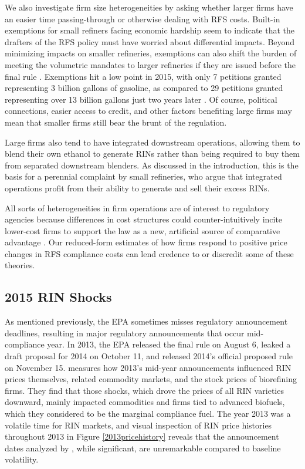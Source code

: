 \documentclass[11pt]{article}
\begin{document}
We also investigate firm size heterogeneities by asking whether larger firms have an easier time passing-through or otherwise dealing with RFS costs. Built-in exemptions for small refiners facing economic hardship seem to indicate that the drafters of the RFS policy must have worried about differential impacts. Beyond minimizing impacts on smaller refineries, exemptions can also shift the burden of meeting the volumetric mandates to larger refineries if they are issued before the final rule \citep{Coppess2017}. Exemptions hit a low point in 2015, with only 7 petitions granted representing 3 billion gallons of gasoline, as compared to 29 petitions granted representing over 13 billion gallons just two years later \citep{EnvironmentalProtectionAgency2018}. Of course, political connections, easier access to credit, and other factors benefiting large firms may mean that smaller firms still bear the brunt of the regulation. 

Large firms also tend to have integrated downstream operations, allowing them to blend their own ethanol to generate RINs rather than being required to buy them from separated downstream blenders. As discussed in the introduction, this is the basis for a perennial complaint by small refineries, who argue that integrated operations profit from their ability to generate and sell their excess RINs. 

All sorts of heterogeneities in firm operations are of interest to regulatory agencies because differences in cost structures could counter-intuitively incite lower-cost firms to support the law as a new, artificial source of comparative advantage \citep{Salop1983}. Our reduced-form estimates of how firms respond to positive price changes in RFS compliance costs can lend credence to or discredit some of these theories.

\subsection{2015 RIN Shocks} \label{sec_2015shocks}

As mentioned previously, the EPA sometimes misses regulatory announcement deadlines, resulting in major regulatory announcements that occur mid-compliance year. In 2013, the EPA released the final rule on August 6, leaked a draft proposal for 2014 on October 11, and released 2014's official proposed rule on November 15. \cite{Lade2018a} measures how 2013's mid-year announcements influenced RIN prices themselves, related commodity markets, and the stock prices of biorefining firms.  They find that those shocks, which drove the prices of all RIN varieties downward, mainly impacted commodities and firms tied to advanced biofuels, which they considered to be the marginal compliance fuel. The year 2013 was a volatile time for RIN markets, and visual inspection of RIN price histories throughout 2013 in Figure \ref{2013pricehistory} reveals that the announcement dates analyzed by \cite{Lade2018a}, while significant, are unremarkable compared to baseline volatility.
\end{document}
